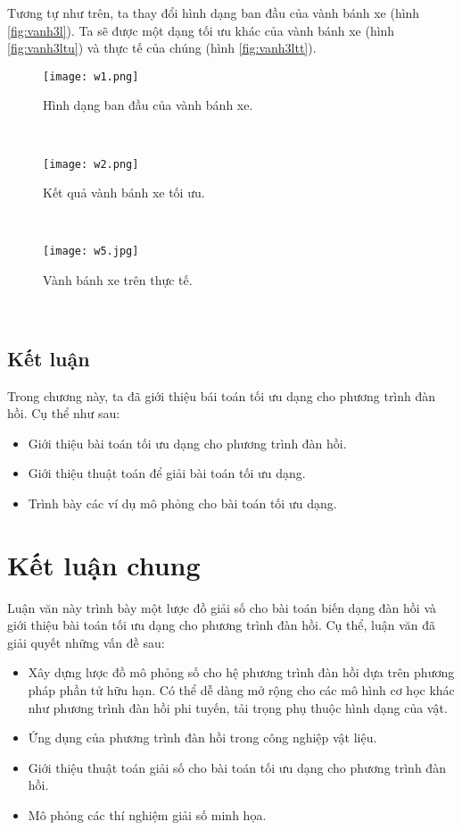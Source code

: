 \documentclass[
12pt, %
oneside, %
english, %
onehalfspacing, %
nolistspacing, %
headsepline, %
addchap,
]{MastersDoctoralThesis} %
\begin{document}
Tương tự như trên, ta thay đổi hình dạng ban đầu của vành bánh xe (hình \ref{fig:vanh3l}). Ta sẽ được một dạng tối ưu khác của vành bánh xe (hình \ref{fig:vanh3ltu}) và thực tế của chúng (hình \ref{fig:vanh3ltt}).
\begin{figure}[http]
\centering
\texttt{[image: w1.png]}
\caption{Hình dạng ban đầu của vành bánh xe.}\label{fig:vanh3l}
\label{fig:w0}
\end{figure}\\
\begin{figure}[http]
\centering
\texttt{[image: w2.png]}
\caption{Kết quả vành bánh xe tối ưu.}\label{fig:vanh3ltu}
\label{fig:w0}
\end{figure}\\
\begin{figure}[http]
\centering
\texttt{[image: w5.jpg]}
\caption{Vành bánh xe trên thực tế.}\label{fig:vanh3ltt}
\label{fig:w0}
\end{figure}\\
\section{Kết luận}
Trong chương này, ta đã giới thiệu bái toán tối ưu dạng cho phương trình đàn hồi. Cụ thể như sau:
\begin{itemize}
\item Giới thiệu bài toán tối ưu dạng cho phương trình đàn hồi.
\item Giới thiệu thuật toán để giải bài toán tối ưu dạng.
\item Trình bày các ví dụ mô phỏng cho bài toán tối ưu dạng.
\end{itemize}


\chapter*{\centering Kết luận chung} %
Luận văn này trình bày một lược đồ giải số cho bài toán biến dạng đàn hồi và giới thiệu bài toán tối ưu dạng cho phương trình đàn hồi. Cụ thể, luận văn đã giải quyết những vấn đề sau:
\begin{itemize}
\item Xây dựng lược đồ mô phỏng số cho hệ phương trình đàn hồi dựa trên phương pháp phần tử hữu hạn. Có thể dễ dàng mở rộng cho các mô hình cơ học khác như phương trình đàn hồi phi tuyến, tải trọng phụ thuộc hình dạng của vật.
\item Ứng dụng của phương trình đàn hồi trong công nghiệp vật liệu.
\item Giới thiệu thuật toán giải số cho bài toán tối ưu dạng cho phương trình đàn hồi.
\item Mô phỏng các thí nghiệm giải số minh họa.
\end{itemize}
\end{document}
